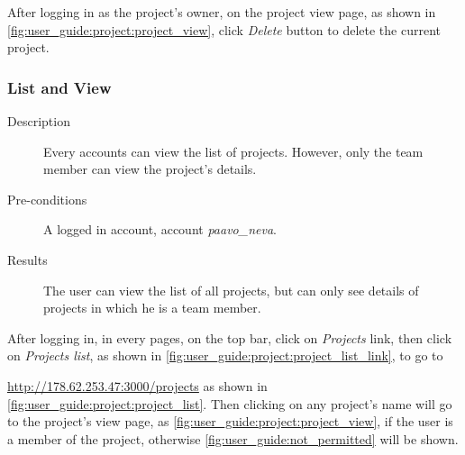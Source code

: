 After logging in as the project's owner, on the project view page, as shown in \autoref{fig:user_guide:project:project_view}, click \emph{Delete} button to delete the current project. 

\subsubsection{List and View}
\label{ch:appendix-a:user_guide:project:list}

\begin{description}
\item[Description] Every accounts can view the list of projects. However, only the team member can view the project's details.
\item[Pre-conditions] A logged in account, \eg account \emph{paavo\_neva}.
\item[Results] The user can view the list of all projects, but can only see details of projects in which he is a team member.
\end{description}

After logging in, in every pages, on the top bar, click on \emph{Projects} link, then click on \emph{Projects list}, as shown in \autoref{fig:user_guide:project:project_list_link}, to go to 

\noindent\href{http://178.62.253.47:3000/projects}{http://178.62.253.47:3000/projects} as shown in \autoref{fig:user_guide:project:project_list}.
Then clicking on any project's name will go to the project's view page, as \autoref{fig:user_guide:project:project_view}, if the user is a member of the project, otherwise \autoref{fig:user_guide:not_permitted} will be shown.

